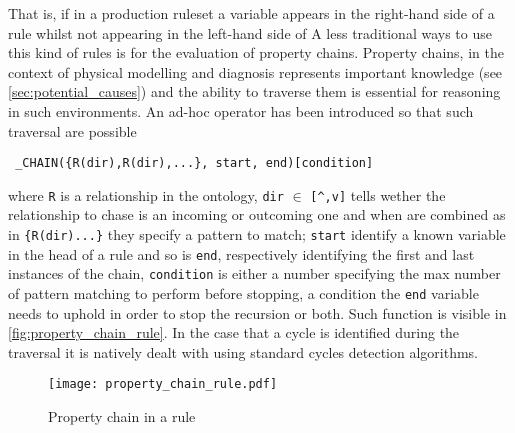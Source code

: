That is, if in a production ruleset a variable appears in the right-hand side of a rule whilst not appearing in the left-hand side of
A less traditional ways to use this kind of rules is for the evaluation of property chains. Property chains, in the context of physical modelling and diagnosis represents important knowledge (see \autoref{sec:potential_causes}) and the ability to traverse them is essential for reasoning in such environments. An ad-hoc operator has been introduced so that such traversal are possible
\begin{verbatim}
 _CHAIN({R(dir),R(dir),...}, start, end)[condition]
\end{verbatim}
where \verb|R| is a relationship in the ontology, \verb|dir| $\in$ \verb|[^,v]| tells wether the relationship to chase is an incoming or outcoming one and when are combined as in \verb|{R(dir)...}| they specify a pattern to match; \verb|start| identify a known variable in the head of a rule and so is \verb|end|, respectively identifying the first and last instances of the chain, \verb|condition| is either a number specifying the max number of pattern matching to perform before stopping, a condition the \verb|end| variable needs to uphold in order to stop the recursion or both. Such function is visible in \autoref{fig:property_chain_rule}. In the case that a cycle is identified during the traversal it is natively dealt with using standard cycles detection algorithms.
\begin{figure}
  \centering
  \texttt{[image: property\_chain\_rule.pdf]}
  \caption{Property chain in a rule}
  \label{fig:property_chain_rule}
\end{figure}

